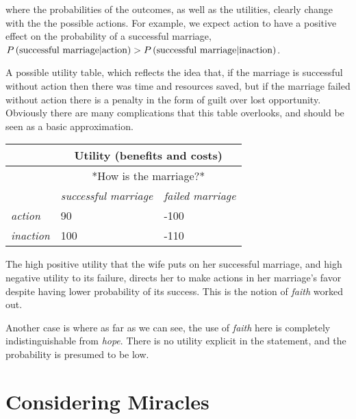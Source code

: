 \documentclass{tufte-book}
\begin{document}
where the probabilities of the outcomes, as well as the utilities,
clearly change with the the possible actions. For example, we expect
action to have a positive effect on the probability of a successful
marriage,
\(P\left(\mbox{successful marriage}|\mbox{action}\right)>P\left(\mbox{successful marriage}|\mbox{inaction}\right)\).

A possible utility table, which reflects the idea that, if the marriage
is successful without action then there was time and resources saved,
but if the marriage failed without action there is a penalty in the form
of guilt over lost opportunity. Obviously there are many complications
that this table overlooks, and should be seen as a basic approximation.

\vspace{.1in}\begin{tabular}{@{}lll@{}}
\toprule
 & \multicolumn{2}{c}{\textbf{Utility (benefits and costs)}}  \\ \midrule
 & \multicolumn{2}{c}{*How is the marriage?*}  \\ 
  & \textit{successful marriage} & \textit{failed marriage}\\
\textit{action}  & 90 & -100   \\
\textit{inaction} &100 & -110  \\ \bottomrule
\end{tabular}\vspace{.1in}

The high positive utility that the wife puts on her successful marriage,
and high negative utility to its failure, directs her to make actions in
her marriage's favor despite having lower probability of its success.
This is the notion of \emph{faith} worked out.

Another case is
where as far as we can see, the use of \emph{faith} here is completely
indistinguishable from \emph{hope}. There is no utility explicit in the
statement, and the probability is presumed to be low.

\chapter{Considering Miracles}\label{considering-miracles}

\newcommand{\hrb}[1]{\href{http://web.bryant.edu/~bblais/#1}{#1}}
\end{document}
